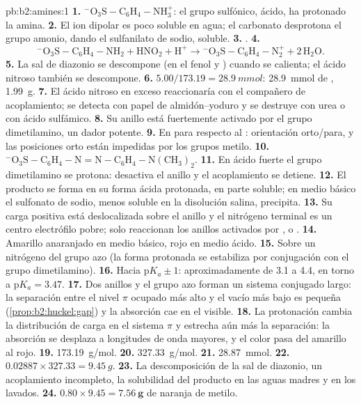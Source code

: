 \begin{solution}{pb:b2:amines:1}
\textbf{1.} $\mathrm{{}^-O_3S{-}C_6H_4{-}NH_3^+}$: el grupo sulfónico, ácido, ha protonado la amina.
\textbf{2.} El ion dipolar es poco soluble en agua; el carbonato desprotona el grupo amonio,
dando el sulfanilato de sodio, soluble.
\textbf{3.} .
\textbf{4.}
\[
  \mathrm{{}^-O_3S{-}C_6H_4{-}NH_2 + HNO_2 + H^+ \to {}^-O_3S{-}C_6H_4{-}N_2^+ + 2\,H_2O} .
\]
\textbf{5.} La sal de diazonio se descompone (en el fenol y ) cuando se calienta; el ácido nitroso
también se descompone.
\textbf{6.} $5.00/173.19 = \qty{28.9}{mmol}$: \qty{28.9}{mmol} de , \qty{1.99}{g}.
\textbf{7.} El ácido nitroso en exceso reaccionaría con el compañero de acoplamiento; se detecta con papel de almidón--yoduro
y se destruye con urea o con ácido sulfámico.
\textbf{8.} Su anillo está fuertemente activado por el grupo dimetilamino, un dador potente.
\textbf{9.} En para respecto al : orientación orto/para, y las posiciones orto están impedidas por los
grupos metilo.
\textbf{10.} $\mathrm{{}^-O_3S{-}C_6H_4{-}N{=}N{-}C_6H_4{-}N(CH_3)_2}$.
\textbf{11.} En ácido fuerte el grupo dimetilamino se protona:  desactiva el anillo
y el acoplamiento se detiene.
\textbf{12.} El producto se forma en su forma ácida protonada, en parte soluble; en medio básico el sulfonato
de sodio, menos soluble en la disolución salina, precipita.
\textbf{13.} Su carga positiva está deslocalizada sobre el anillo y el nitrógeno terminal es un centro
electrófilo pobre; solo reaccionan los anillos activados por ,  o .
\textbf{14.} Amarillo anaranjado en medio básico, rojo en medio ácido.
\textbf{15.} Sobre un nitrógeno del grupo azo (la forma protonada se estabiliza por conjugación con
el grupo dimetilamino).
\textbf{16.} Hacia $\mathrm pK_a \pm 1$: aproximadamente de 3.1 a 4.4, en torno a $\mathrm pK_a = 3.47$.
\textbf{17.} Dos anillos y el grupo azo forman un sistema conjugado largo: la separación entre el nivel $\pi$ ocupado
más alto y el vacío más bajo es pequeña (\cref{prop:b2:huckel:gap}) y la absorción
cae en el visible.
\textbf{18.} La protonación cambia la distribución de carga en el sistema $\pi$ y estrecha aún más la
separación: la absorción se desplaza a longitudes de onda mayores, y el color pasa del amarillo al rojo.
\textbf{19.} \qty{173.19}{g/mol}.
\textbf{20.} \qty{327.33}{g/mol}.
\textbf{21.} \qty{28.87}{mmol}.
\textbf{22.} $0.02887 \times 327.33 = \qty{9.45}{g}$.
\textbf{23.} La descomposición de la sal de diazonio, un acoplamiento incompleto, la solubilidad del producto en
las aguas madres y en los lavados.
\textbf{24.} $0.80 \times 9.45 = \boldsymbol{\qty{7.56}{g}}$ de naranja de metilo.
\end{solution}
